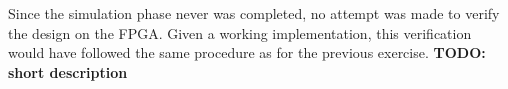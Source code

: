 Since the simulation phase never was completed, no attempt was made to verify
the design on the FPGA. Given a working implementation, this verification would
have followed the same procedure as for the previous exercise.
\textbf{TODO: short description}
